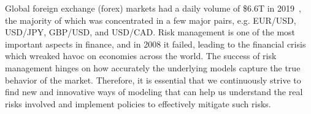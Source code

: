 Global foreign exchange (forex) markets had a daily volume of \$6.6T in 2019~\cite{bis_2019}, the majority of which was concentrated in a few major pairs, e.g. EUR/USD, USD/JPY, GBP/USD, and USD/CAD.
Risk management is one of the most important aspects in finance, and in 2008 it failed, leading to the financial crisis which wreaked havoc on economies across the world.
The success of risk management hinges on how accurately the underlying models capture the true behavior of the market.
Therefore, it is essential that we continuously strive to find new and innovative ways of modeling that can help us understand the real risks involved and implement policies to effectively mitigate such risks.
